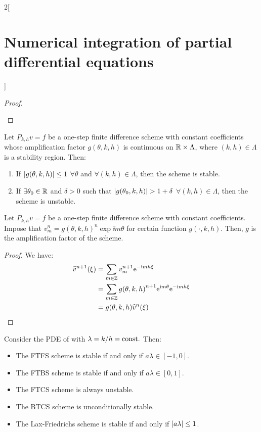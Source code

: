 \documentclass[../../../main_math.tex]{subfiles}
\begin{document}
\begin{multicols}{2}[\section{Numerical integration of partial differential equations}]
\begin{proof}
\begin{enumerate}
    \end{enumerate}
  \end{proof}
  \begin{corollary}
    Let $P_{k,h}{v}={f}$ be a one-step finite difference scheme with constant coefficients whose amplification factor $g(\theta,k,h)$ is continuous on $\mathbb{R}\times\Lambda$, where $(k,h)\in\Lambda$ is a stability region. Then:
    \begin{enumerate}
      \item If $\abs{g(\theta,k,h)}\leq 1$ $\forall \theta$ and $\forall(k,h)\in\Lambda$, then the scheme is stable.
      \item If $\exists\theta_0\in\mathbb{R}$ and $\delta>0$ such that $\abs{g(\theta_0,k,h)}>1+\delta$ $\forall(k,h)\in\Lambda$, then the scheme is unstable.
    \end{enumerate}
  \end{corollary}
  \begin{lemma}
    Let $P_{k,h}{v}={f}$ be a one-step finite difference scheme with constant coefficients. Impose that $v_m^n= {g(\theta,k,h)}^n\exp{\ii m\theta}$ for certain function $g(\cdot,k,h)$. Then, $g$ is the amplification factor of the scheme.
  \end{lemma}
  \begin{proof}We have:
    \begin{align*}
      \widehat{v}^{n+1}(\xi) & =\sum_{m\in\mathbb{Z}} v_m^{n+1}\mathrm{e}^{-\mathrm{i} mh\xi}                              \\
                             & =\sum_{m\in\mathbb{Z}} {g(\theta,k,h)}^{n+1}\mathrm{e}^{\mathrm{i} m\theta}\mathrm{e}^{-\mathrm{i} mh\xi} \\
                             & =g(\theta,k,h)\widehat{v}^n(\xi)
    \end{align*}
  \end{proof}
  \begin{proposition}
    Consider the PDE of  with $\lambda =k/h=\text{const.}$ Then:
    \begin{itemize}
      \item The FTFS scheme is stable if and only if $a\lambda\in [-1,0]$.
      \item The FTBS scheme is stable if and only if $a\lambda\in [0,1]$.
      \item The FTCS scheme is always unstable.
      \item The BTCS scheme is unconditionally stable.
      \item The Lax-Friedrichs scheme is stable if and only if $\abs{a\lambda}\leq 1$.

\end{itemize}
\end{proposition}
\end{multicols}
\end{document}
